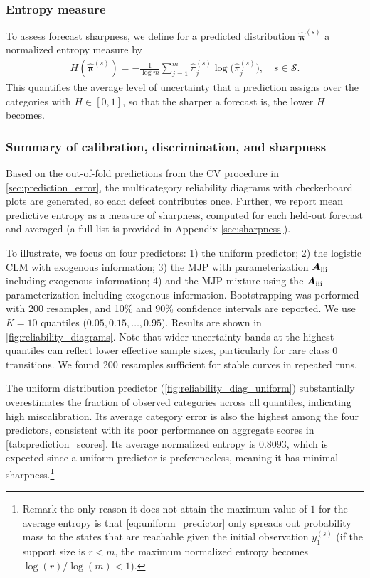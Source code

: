 \documentclass{article}
\newcommand{\RN}[1]{\textup{\uppercase\expandafter{\romannumeral#1}}}
\begin{document}
\subsubsection{Entropy measure}
To assess forecast sharpness, we define for a predicted distribution $\widehat{\bm\pi}^{(s)}$ a normalized entropy measure by
\begin{align}
H(\widehat{\bm\pi}^{(s)}) = - \frac{1}{\log m}\sum_{j=1}^{m}\widehat{\pi}^{(s)}_j \log\!\big(\widehat{\pi}^{(s)}_j\big), \quad s \in \mathcal S.\label{eq:entropy}
\end{align}
This quantifies the average level of uncertainty that a prediction assigns over the categories with $H \in [0,1]$, so that the sharper a forecast is, the lower $H$ becomes.

\subsubsection{Summary of calibration, discrimination, and sharpness}
Based on the out-of-fold predictions from the CV procedure in \cref{sec:prediction_error}, the multicategory reliability diagrams with checkerboard plots are generated, so each defect contributes once. Further, we report mean predictive entropy as a measure of sharpness, computed for each held-out forecast and averaged (a full list is provided in Appendix \ref{sec:sharpness}).

To illustrate, we focus on four predictors: 
1) the uniform predictor; 
2) the logistic CLM with exogenous information; 
3) the MJP with parameterization $\bm{A}_{\RN{3}}$ including exogenous information;
4) and the MJP mixture using the $\bm{A}_{\RN{3}}$ parameterization including exogenous information. 
Bootstrapping was performed with 200 resamples, and 10\% and 90\% confidence intervals are reported. We use $K = 10$ quantiles ($0.05, 0.15, \dots, 0.95$). Results are shown in \cref{fig:reliability_diagrams}.
Note that wider uncertainty bands at the highest quantiles can reflect lower effective sample sizes, particularly for rare class $0$ transitions. We found 200 resamples sufficient for stable curves in repeated runs.




The uniform distribution predictor (\cref{fig:reliability_diag_uniform}) substantially overestimates the fraction of observed categories across all quantiles, indicating high miscalibration.
Its average category error is also the highest among the four predictors, consistent with its poor performance on aggregate scores in \cref{tab:prediction_scores}. Its average normalized entropy is $0.8093$, which is expected since a uniform predictor is preferenceless, meaning it has minimal sharpness.\footnote{Remark the only reason it does not attain the maximum value of $1$ for the average entropy is that \cref{eq:uniform_predictor} only spreads out probability mass to the states that are reachable given the initial observation $y_1^{(s)}$ (if the support size is $r<m$, the maximum normalized entropy becomes $\log(r)/\log(m) < 1$).}
\end{document}
